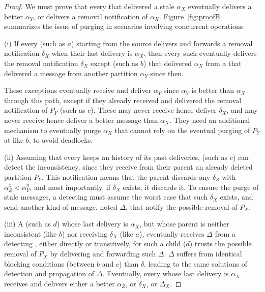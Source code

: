 \begin{proof}
   We must prove that every \process that delivered
  a stale $\alpha_X$ eventually delivers a better $\alpha_Y$, or
  delivers a removal notification of $\alpha_X$.
  Figure~\ref{fig:proofB} summarizes the issue of purging in scenarios
  involving concurrent operations.
  
  (i) If every \process (such as $a$) starting from the source
  delivers and forwards a removal notification $\delta_X$ when their
  last delivery is $\alpha_X$, then every such \process eventually
  delivers the removal notification $\delta_X$ except \processes (such
  as $b$) that delivered $\alpha_X$ from a \process that delivered a
  message from another partition $\alpha_Y$ since then.
  
  These exceptions eventually receive and deliver $\alpha_Y$ since
  $\alpha_Y$ is better than $\alpha_X$ through this path, except if
  they already received and delivered the removal notification of
  $P_Y$ (such as $c$). These \processes may never receive hence
  deliver $\delta_X$, and may never receive hence deliver a better
  message than $\alpha_X$. They need an additional mechanism to
  eventually purge $\alpha_X$ that cannot rely on the eventual purging
  of $P_Y$ at \processes like $b$, to avoid deadlocks.
  
  (ii) Assuming that every \process keeps an history of its past
  deliveries, \processes (such as $c$) can detect the inconsistency,
  since they receive from their parent an already deleted partition
  $P_Y$. This notification means that the parent discards any
  $\delta_Z$ with $\alpha_Z^z < \alpha_Y^y$, and most importantly, if
  $\delta_X$ exists, it discards it. To ensure the purge of stale
  messages, a detecting \process must assume the worst case that such
  $\delta_X$ exists, and send another kind of message, noted $\Delta$,
  that notify the possible removal of $P_X$.
  
  (iii) A \process (such as $d$) whose last delivery is $\alpha_X$,
  but whose parent is neither inconsistent (like $b$) nor receiving
  $\delta_X$ (like $a$), eventually receives $\Delta$ from a detecting
  \process, either directly or transitively, for such a child \process
  ($d$) trusts the possible removal of $P_X$ by delivering and
  forwarding such $\Delta$. $\Delta$ suffers from identical blocking
  conditions (between $b$ and $c$) than $\delta$, leading to the same
  solutions of detection and propagation of $\Delta$. Eventually,
  every \process whose last delivery is $\alpha_X$ receives and
  delivers either a better $\alpha_Z$, or $\delta_X$, or $\Delta_X$.
\end{proof}

